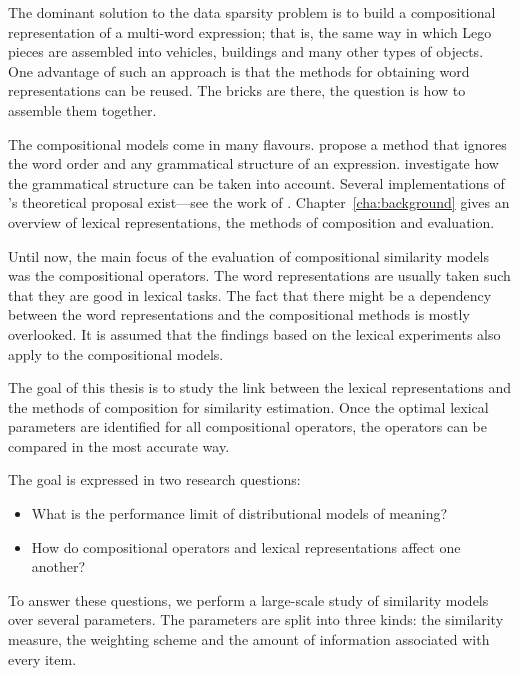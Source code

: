 The dominant solution to the data sparsity problem is to build a compositional representation of a multi-word expression; that is, the same way in which Lego pieces are assembled into vehicles, buildings and many other types of objects. One advantage of such an approach is that the methods for obtaining word representations can be reused. The bricks are there, the question is how to assemble them together.

The compositional models come in many flavours. \citet{mitchell2010composition} propose a method that ignores the word order and any grammatical structure of an expression. \citet{DBLP:journals/corr/abs-1003-4394,baroni2014frege} investigate how the grammatical structure can be taken into account. Several implementations of \citet{DBLP:journals/corr/abs-1003-4394}'s theoretical proposal exist---see the work of \citet{Grefenstette:2011:ESC:2145432.2145580,Grefenstette:2011:ETV:2140490.2140497,kartsadrqpl2014,fried-polajnar-clark:2015:ACL-IJCNLP}. Chapter~\ref{cha:background} gives an overview of lexical representations, the methods of composition and evaluation.

Until now, the main focus of the evaluation of compositional similarity models was the compositional operators. The word representations are usually taken such that they are good in lexical tasks. The fact that there might be a dependency between the word representations and the compositional methods is mostly overlooked. It is assumed that the findings based on the lexical experiments also apply to the compositional models.

The goal of this thesis is to study the link between the lexical representations and the methods of composition for similarity estimation. Once the optimal lexical parameters are identified for all compositional operators, the operators can be compared in the most accurate way.

The goal is expressed in two research questions:
\begin{itemize}
\item What is the performance limit of distributional models of meaning?
\item How do compositional operators and lexical representations affect one another?
\end{itemize}

To answer these questions, we perform a large-scale study of similarity models over several parameters. The parameters are split into three kinds: the similarity measure, the weighting scheme and the amount of information associated with every item.

